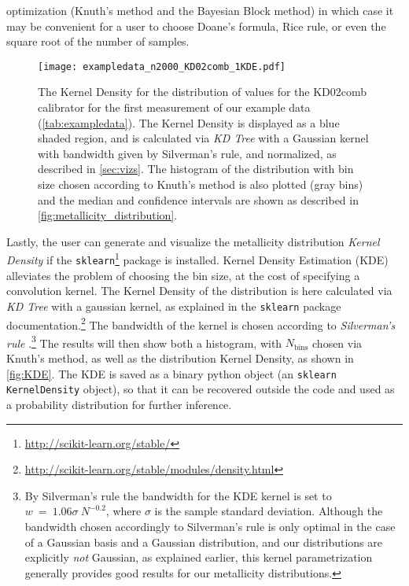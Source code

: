 \documentclass{emulateapj}
\begin{document}
optimization (Knuth's method and the Bayesian Block method) in which
case it may be convenient for a user to choose Doane's formula, Rice
rule, or even the square root of the number of samples.
\begin{figure}[ht!]
  \texttt{[image: exampledata\_n2000\_KD02comb\_1KDE.pdf]}
   \caption{The Kernel Density for the distribution of values for the
     KD02comb calibrator for the first measurement of our example data
     (\autoref{tab:exampledata}). The Kernel Density is displayed as
     a blue shaded region, and is calculated via \emph{KD Tree} with a
     Gaussian kernel with bandwidth given by Silverman's rule, and
     normalized, as described in \autoref{sec:vizs}. The histogram of
     the distribution with bin size chosen according to Knuth's method
     is also plotted (gray bins) and the median and confidence
     intervals are shown as described in
     \autoref{fig:metallicity_distribution}.}\label{fig:KDE}
\end{figure}

Lastly, the user can generate and visualize the metallicity
distribution \emph{Kernel Density} if the
\verb=sklearn=\footnote{\url{http://scikit-learn.org/stable/}} package
is installed. Kernel Density Estimation (KDE) alleviates the problem
of choosing the bin size, at the cost of specifying a convolution
kernel. The Kernel Density of the distribution is here calculated via
\emph{KD Tree} with a gaussian kernel, as explained in the
\verb=sklearn= package
documentation.\footnote{\url{http://scikit-learn.org/stable/modules/density.html}}
The bandwidth of the kernel is chosen according to \emph{Silverman's
  rule} \citep{silverman86}.\footnote{By Silverman's rule the
  bandwidth for the KDE kernel is set to $w~=~1.06\sigma~N^{-0.2}$,
  where $\sigma$ is the sample standard deviation. Although the
  bandwidth chosen accordingly to Silverman's rule is only optimal in
  the case of a Gaussian basis and a Gaussian distribution, and our
  distributions are explicitly \emph{not} Gaussian, as explained
  earlier, this kernel parametrization generally provides good results
  for our metallicity distributions.} The results will then show both
a histogram, with $N_\mathrm{bins}$ chosen via Knuth's method, as well
as the distribution Kernel Density, as shown in
\autoref{fig:KDE}. The KDE is saved as a binary python object (an
\verb=sklearn= \verb=KernelDensity= object), so that it can be
recovered outside the code and used as a probability distribution for
further inference.
\end{document}
